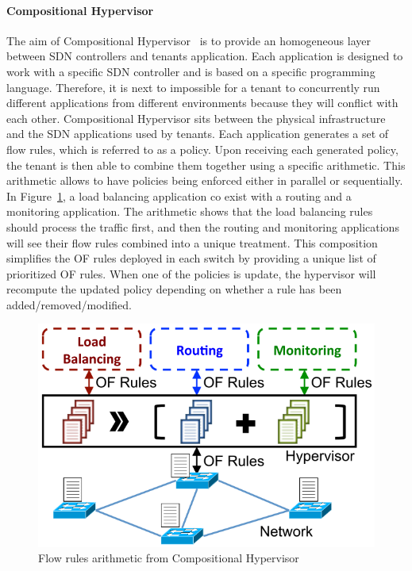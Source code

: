 \paragraph{Compositional Hypervisor}
The aim of Compositional Hypervisor~\cite{CompositionalHypervisor-Jin2014} is to provide an homogeneous layer between SDN controllers and tenants application.
Each application is designed to work with a specific SDN controller and is based on a specific programming language. Therefore, it is next to impossible for a tenant to concurrently run different applications from different environments because they will conflict with each other. Compositional Hypervisor sits between the physical infrastructure and the SDN applications used by tenants.
Each application generates a set of flow rules, which is referred to as a policy.
Upon receiving each generated policy, the tenant is then able to combine them together using a specific arithmetic.
This arithmetic allows to have policies being enforced either in parallel or sequentially. 
In Figure~\ref{fig:compositional-hyp}, a load balancing application co exist with a routing and a monitoring application. The arithmetic shows that the load balancing rules should process the traffic first, and then the routing and monitoring applications will see their flow rules combined into a unique treatment.
This composition simplifies the OF rules deployed in each switch by providing a unique list of prioritized OF rules. When one of the policies is update, the hypervisor will recompute the updated policy depending on whether a rule has been added/removed/modified.

\begin{figure}[ht]
    \centering
    \includegraphics[scale=0.7]{figures/compositional-structure.png}
    \caption{Flow rules arithmetic from Compositional Hypervisor~\cite{CompositionalHypervisor-Jin2014}}
    \label{fig:compositional-hyp}
\end{figure}

